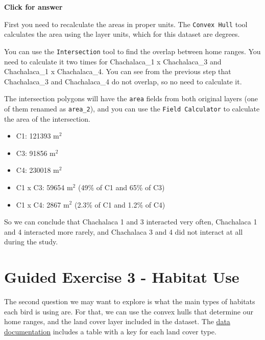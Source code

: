 \documentclass[
  letterpaper,
  DIV=11,
  numbers=noendperiod]{scrreprt}
\providecommand{\tightlist}{%
  \setlength{\itemsep}{0pt}\setlength{\parskip}{0pt}}\usepackage{longtable,booktabs,array}
\begin{document}
\begin{tcolorbox}[enhanced jigsaw, toprule=.15mm, breakable, left=2mm, colframe=quarto-callout-important-color-frame, colback=white, arc=.35mm, leftrule=.75mm, opacityback=0, rightrule=.15mm, bottomrule=.15mm]

\vspace{-3mm}\textbf{Click for answer}\vspace{3mm}

First you need to recalculate the areas in proper units. The
\texttt{Convex\ Hull} tool calculates the area using the layer units,
which for this dataset are degrees.

You can use the \texttt{Intersection} tool to find the overlap between
home ranges. You need to calculate it two times for Chachalaca\_1 x
Chachalaca\_3 and Chachalaca\_1 x Chachalaca\_4. You can see from the
previous step that Chachalaca\_3 and Chachalaca\_4 do not overlap, so no
need to calculate it.

The intersection polygons will have the \texttt{area} fields from both
original layers (one of them renamed as \texttt{area\_2}), and you can
use the \texttt{Field\ Calculator} to calculate the area of the
intersection.

\begin{itemize}
\tightlist
\item
  C1: 121393 m\(^2\)
\item
  C3: 91856 m\(^2\)
\item
  C4: 230018 m\(^2\)
\item
  C1 x C3: 59654 m\(^2\) (49\% of C1 and 65\% of C3)
\item
  C1 x C4: 2867 m\(^2\) (2.3\% of C1 and 1.2\% of C4)
\end{itemize}

So we can conclude that Chachalaca 1 and 3 interacted very often,
Chachalaca 1 and 4 interacted more rarely, and Chachalaca 3 and 4 did
not interact at all during the study.

\end{tcolorbox}

\section{Guided Exercise 3 - Habitat
Use}\label{guided-exercise-3---habitat-use}

The second question we may want to explore is what the main types of
habitats each bird is using are. For that, we can use the convex hulls
that determine our home ranges, and the land cover layer included in the
dataset. The
\href{https://www.arcgis.com/home/item.html?id=cfcb7609de5f478eb7666240902d4d3d}{data
documentation} includes a table with a key for each land cover type.
\end{document}
